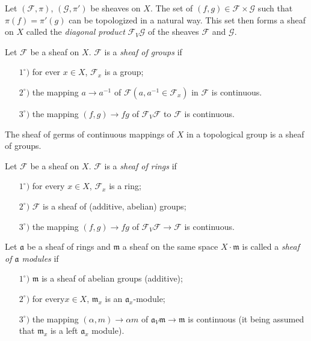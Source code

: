 \medskip
{}

Let $(\mathscr{F}, \pi)$, $(\mathscr{G}, \pi')$ be sheaves on $X$. The
set of $(f, g) \in \mathscr{F} \times \mathscr{G}$ such that $\pi(f) =
\pi'(g)$ can be topologized in a natural way. This set then forms a
sheaf on $X$ called the \textit{diagonal product} $\mathscr{F}_V
\mathscr{G}$ of the sheaves $\mathscr{F}$ and $\mathscr{G}$. 

\medskip
{} Let $\mathscr{F}$ be a sheaf on
$X$. $\mathscr{F}$ is a \textit{sheaf of groups} if 
\begin{itemize}
\item[$1^\circ)$] for ever $x \in X$, $\mathscr{F}_x$ is a group;

\item[$2^\circ)$] the mapping $a \to a^{-1}$ of $\mathscr{F} (a,
  a^{-1} \in \mathscr{F}_x)$ in $\mathscr{F}$ is continuous.

\item[$3^\circ)$] the mapping $(f, g) \to fg$ of $\mathscr{F}_V
  \mathscr{F}$ to $\mathscr{F}$ is continuous.
\end{itemize}

\begin{example*}
The sheaf of germs of continuous mappings of $X$ in a topological
group is a sheaf of groups.
\end{example*}


\medskip
{}

Let $\mathscr{F}$ be a sheaf on $X$. $\mathscr{F}$ is a \textit{sheaf
  of rings} if 
\begin{itemize}
\item[$1^\circ)$] for every $x \in X$, $\mathscr{F}_x$ is a ring;

\item[$2^\circ)$] $\mathscr{F}$ is a sheaf of (additive, abelian) groups;

\item[$3^\circ)$] the mapping $(f,g) \to fg $ of $\mathscr{F}_V
  \mathscr{F} \to \mathscr{F}$ is continuous. 
\end{itemize}

Let $\mathfrak{a}$ be a sheaf of rings and $\mathfrak{m}$ a sheaf on
the same space $X \cdot \mathfrak{m}$ is called a \textit{sheaf of
  $\mathfrak{a}$ modules} if
\begin{itemize}
\item[$1^\circ)$] $\mathfrak{m}$ is a sheaf of abelian groups (additive);

\item[$2^\circ)$] for every\pageoriginale $x \in X$, $\mathfrak{m}_x$ is an
  $\mathfrak{a}_x$-module;

\item[$3^\circ)$] the mapping $(\alpha, m) \to \alpha m$ of
  $\mathfrak{a}_V \mathfrak{m} \to \mathfrak{m}$ is continuous (it
  being assumed that $\mathfrak{m}_x$ is a left $\mathfrak{a}_x$
  module). 
\end{itemize}

